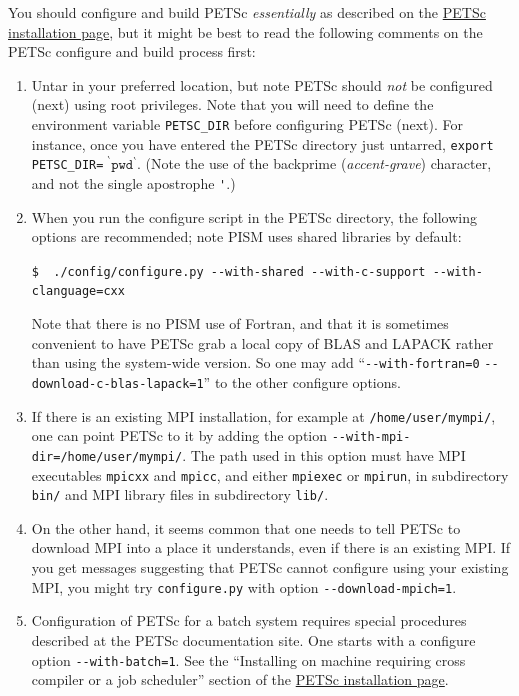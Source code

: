 \documentclass[11pt,final]{amsart}
\begin{document}
\begin{enumerate}
You should configure and build PETSc \emph{essentially} as described on the  \href{http://www-unix.mcs.anl.gov/petsc/petsc-2/documentation/installation.html}{PETSc installation page}, but it might be best to read the following comments on the PETSc configure and build process first:

\renewcommand{\labelenumii}{(\roman{enumii})}\begin{enumerate}
\item Untar in your preferred location, but note PETSc should \emph{not} be configured (next) using root privileges.  Note that you will need to define the environment variable \verb|PETSC_DIR| before configuring PETSc (next).  For instance, once you have entered the PETSc directory just untarred, \verb|export PETSC_DIR=|$\phantom{!}^\backprime \mathtt{pwd}^\backprime$.  (Note the use of the backprime (\emph{accent-grave}) character, and not the single apostrophe \verb|'|.)

\item When you run the configure script in the PETSc directory, the following options are recommended; note PISM uses shared libraries by default:

\verb|$  ./config/configure.py --with-shared --with-c-support --with-clanguage=cxx|

Note that there is no PISM use of Fortran, and that it is sometimes convenient to have PETSc grab a local copy of BLAS and LAPACK rather than using the system-wide version.  So one may add ``\verb|--with-fortran=0| \verb|--download-c-blas-lapack=1|'' to the other configure options.

\item If there is an existing MPI installation, for example at \verb|/home/user/mympi/|, one can point PETSc to it by adding the option \verb|--with-mpi-dir=/home/user/mympi/|.  The path used in this option must have MPI executables \verb|mpicxx| and \verb|mpicc|, and either \verb|mpiexec| or \verb|mpirun|, in subdirectory \verb|bin/| and MPI library files in subdirectory \verb|lib/|.

\item On the other hand, it seems common that one needs to tell PETSc to download MPI into a place it understands, even if there is an existing MPI.  If you get messages suggesting that PETSc cannot configure using your existing MPI, you might try \verb|configure.py| with option \verb|--download-mpich=1|.

\item Configuration of PETSc for a batch system requires special procedures described at the PETSc documentation site.  One starts with a configure option \verb|--with-batch=1|.  See the ``Installing on machine requiring cross compiler or a job scheduler'' section of the \href{http://www-unix.mcs.anl.gov/petsc/petsc-2/documentation/installation.html}{PETSc installation page}.


\end{enumerate}
\end{enumerate}
\end{document}
